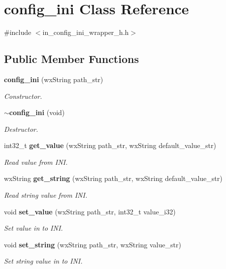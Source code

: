\section{config\+\_\+ini Class Reference}
\label{classconfig__ini}


{\ttfamily \#include $<$in\+\_\+config\+\_\+ini\+\_\+wrapper\+\_\+h.\+h$>$}

\subsection*{Public Member Functions}
\begin{DoxyCompactItemize}
\item 
\textbf{ config\+\_\+ini} (wx\+String path\+\_\+str)
\begin{DoxyCompactList}\small\item\em Constructor. \end{DoxyCompactList}\item 
\textbf{ $\sim$config\+\_\+ini} (void)
\begin{DoxyCompactList}\small\item\em Destructor. \end{DoxyCompactList}\item 
int32\+\_\+t \textbf{ get\+\_\+value} (wx\+String path\+\_\+str, wx\+String default\+\_\+value\+\_\+str)
\begin{DoxyCompactList}\small\item\em Read value from I\+NI. \end{DoxyCompactList}\item 
wx\+String \textbf{ get\+\_\+string} (wx\+String path\+\_\+str, wx\+String default\+\_\+value\+\_\+str)
\begin{DoxyCompactList}\small\item\em Read string value from I\+NI. \end{DoxyCompactList}\item 
void \textbf{ set\+\_\+value} (wx\+String path\+\_\+str, int32\+\_\+t value\+\_\+i32)
\begin{DoxyCompactList}\small\item\em Set value in to I\+NI. \end{DoxyCompactList}\item 
void \textbf{ set\+\_\+string} (wx\+String path\+\_\+str, wx\+String value\+\_\+str)
\begin{DoxyCompactList}\small\item\em Set string value in to I\+NI. \end{DoxyCompactList}\end{DoxyCompactItemize}
